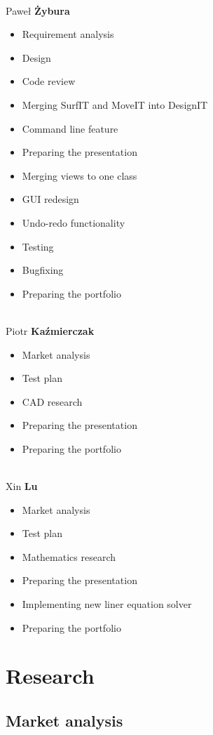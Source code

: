 \documentclass[a4paper, 11pt, article]{report}
\begin{document}
\noindent \\ Paweł \textbf{Żybura} 
\begin{itemize}
	\item Requirement analysis
	\item Design
	\item Code review
	\item Merging SurfIT and MoveIT into DesignIT
	\item Command line feature
	\item Preparing the presentation
	\item Merging views to one class
	\item GUI redesign
	\item Undo-redo functionality
	\item Testing 
	\item Bugfixing
	\item Preparing the portfolio
\end{itemize}

\noindent \\ Piotr \textbf{Kaźmierczak} 
\begin{itemize}
	\item Market analysis
	\item Test plan
	\item CAD research
	\item Preparing the presentation
	\item Preparing the portfolio
\end{itemize}

\noindent \\ Xin \textbf{Lu}
\begin{itemize}
	\item Market analysis
	\item Test plan
	\item Mathematics research
	\item Preparing the presentation
	\item Implementing new liner equation solver
	\item Preparing the portfolio
\end{itemize}


\chapter{Research}

\section{Market analysis}
\end{document}
